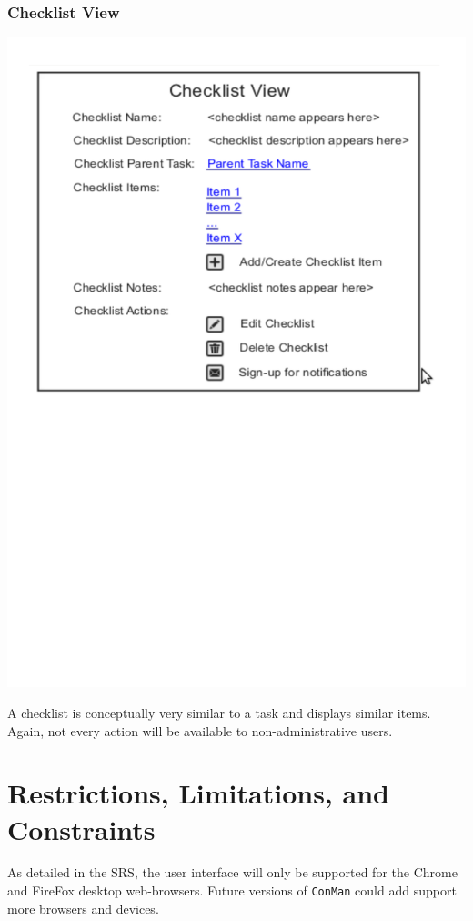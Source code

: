 \documentclass{article}
\begin{document}
\subsubsection{Checklist View}
\begin{center}
\includegraphics[trim = 0cm 12cm 0cm 0cm, clip=true, scale=0.7]{images/checklistview}
\end{center}
A checklist is conceptually very similar to a task and displays similar items.
Again, not every action will be available to non-administrative users.
\newpage
\section{Restrictions, Limitations, and Constraints}
As detailed in the SRS, the user interface will only be supported for the Chrome and FireFox desktop web-browsers.
Future versions of \texttt{ConMan} could add support more browsers and devices.
\end{document}
